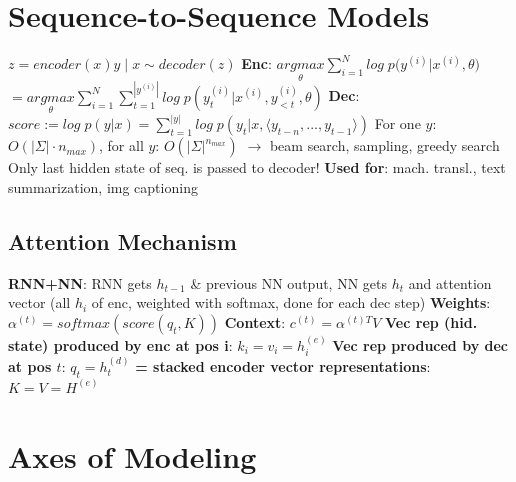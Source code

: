 \documentclass[a4paper, 11pt, landscape]{article}
\begin{document}
\begin{multicols*}{3}
\section{Sequence-to-Sequence Models}
$z=encoder(x)$\qquad$y\;|\;x\sim decoder(z)$\newline
\textbf{Enc}: $\underset{{\theta}}{argmax}\sum_{i=1}^{N}{log\;p(y^{(i)}|x^{(i)}},\theta)$\newline$=\underset{{\theta}}{argmax}\sum_{i=1}^{N}\sum_{t=1}^{|y^{(i)}|}{log\;p(y_t^{(i)}|x^{(i)},y_{<t}^{(i)},\theta)}$\newline
\textbf{Dec}: $score:=log\;p(y|x)=\sum_{t=1}^{|y|}{log\;p(y_t|x,\langle y_{t-n},...,y_{t-1}\rangle)}$\newline
For one $y$: $O(|\Sigma|\cdot n_{max})$, for all $y$: $O(|\Sigma|^{n_{max}})$\newline
$\rightarrow$ beam search, sampling, greedy search\newline
Only last hidden state of seq. is passed to decoder!\newline
\textbf{Used for}: mach. transl., text summarization, img captioning

\subsection{Attention Mechanism}
\textbf{RNN+NN}: RNN gets $h_{t-1}$ \& previous NN output, NN gets $h_t$ and attention vector (all $h_i$ of enc, weighted with softmax, done for each dec step)\newline
\textbf{Weights}: $\alpha^{(t)}=softmax(score(q_t,K))$\newline
\textbf{Context}: $c^{(t)}=\alpha^{(t)T}V$\newline
\textbf{Vec rep (hid. state) produced by enc at pos i}: $k_i=v_i=h_i^{(e)}$\newline
\textbf{Vec rep produced by dec at pos $t$}: $q_t=h_t^{(d)}$\newline
\textbf{= stacked encoder vector representations}: $K=V=H^{(e)}$

\section{Axes of Modeling}

\end{multicols*}
\end{document}
